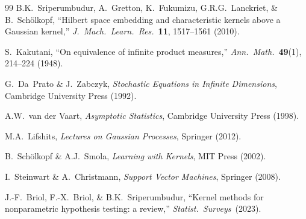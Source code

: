 \documentclass[12pt, oneside]{book}
\theoremstyle{plain}
\theoremstyle{definition}
\begin{document}
\begin{thebibliography}{99}
B.K.~Sriperumbudur, A.~Gretton, K.~Fukumizu, G.R.G.~Lanckriet, \& B.~Sch\"olkopf,
``Hilbert space embedding and characteristic kernels above a Gaussian kernel,''
\textit{J.\ Mach.\ Learn.\ Res.}\ \textbf{11}, 1517--1561 (2010).

S.~Kakutani,
``On equivalence of infinite product measures,''
\textit{Ann.\ Math.}\ \textbf{49}(1), 214--224 (1948).

G.~Da~Prato \& J.~Zabczyk,
\textit{Stochastic Equations in Infinite Dimensions},
Cambridge University Press (1992).

A.W.~van der Vaart,
\textit{Asymptotic Statistics},
Cambridge University Press (1998).

M.A.~Lifshits,
\textit{Lectures on Gaussian Processes},
Springer (2012).

B.~Sch\"olkopf \& A.J.~Smola,
\textit{Learning with Kernels},
MIT Press (2002).

I.~Steinwart \& A.~Christmann,
\textit{Support Vector Machines},
Springer (2008).

J.-F.~Briol, F.-X.~Briol, \& B.K.~Sriperumbudur,
``Kernel methods for nonparametric hypothesis testing: a review,''
\textit{Statist.\ Surveys}\ (2023).

\end{thebibliography}
\end{document}
